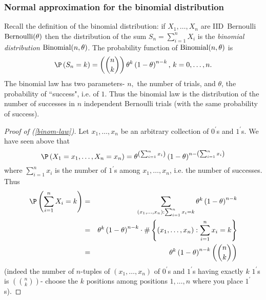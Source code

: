 \subsubsection{Normal approximation for the binomial distribution}

Recall the definition of the binomial distribution: if $X_{1},\ldots ,X_{n}$
are IID\ Bernoulli $\mbox{{\rm Bernoulli}}(\theta)$ then the distribution of the sum $%
S_{n}=\sum_{i=1}^{n}X_{i}$ is the \textit{binomial distribution} $\mbox{{\rm Binomial}}(n,\theta)$.
The probability function of $\mbox{{\rm Binomial}}(n,\theta)$ is 
\begin{equation}
\P \left( S_{n}=k\right) =\left( \binom{n}{k}\right) \theta^{k}\left( 1-\theta\right)
^{n-k}\text{, }k=0,\ldots ,n.  \label{binom-law}
\end{equation}%
The binomial law has two parameters- $n,$ the number of trials, and $\theta$, the
probability of ``success", i.e. of $1$. Thus the binomial law is the
distribution of the number of successes in $n$ independent Bernoulli trials
(with the same probability of success).

\bigskip

\begin{proof}[Proof of (\protect\ref{binom-law})]
Let $x_{1},\ldots ,x_{n}$ be an arbitrary collection of $0^{\prime }$s and $%
1^{\prime }$s$.$ We have seen above that 
\begin{equation*}
\P \left( X_{1}=x_{1},\ldots ,X_{n}=x_{n}\right) =\theta^{\left(
\sum_{i=1}^{n}x_{i}\right) }\left( 1-\theta\right) ^{n-\left(
\sum_{i=1}^{n}x_{i}\right) }
\end{equation*}%
where $\sum_{i=1}^{n}x_{i}$ is the number of $1^{\prime }$s among $%
x_{1},\ldots ,x_{n}$, i.e. the number of successes. Thus 
\begin{eqnarray*}
\P \left( \sum_{i=1}^{n}X_{i}=k\right) &=&\sum_{\left( x_{1},\ldots
,x_{n}\right) :\sum_{i=1}^{n}x_{i}=k}\theta^{k}\left( 1-\theta\right) ^{n-k} \\
&=&\theta^{k}\left( 1-\theta\right) ^{n-k}\cdot \#\left\{ \left( x_{1},\ldots
,x_{n}\right) :\sum_{i=1}^{n}x_{i}=k\right\} \\
&=&\theta^{k}\left( 1-\theta\right) ^{n-k}\left( \binom{n}{k}\right)
\end{eqnarray*}%
(indeed the number of $n$-tuples of $\left( x_{1},\ldots ,x_{n}\right) $ of $%
0^{\prime }$s and $1^{\prime }$s having exactly $k$ $1^{\prime }$s is $%
\left( \binom{n}{k}\right) $- choose the $k$ positions among positions $%
1,\ldots ,n$ where you place $1^{\prime }$s).
\end{proof}

